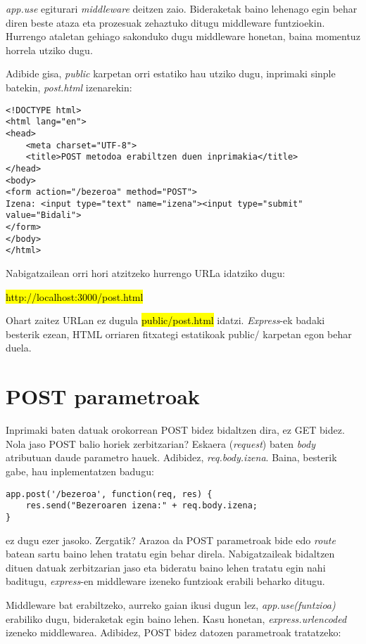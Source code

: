 \textit{app.use} egiturari \textit{middleware} deitzen zaio. Bideraketak baino lehenago egin behar diren beste ataza eta prozesuak zehaztuko ditugu middleware funtzioekin. Hurrengo ataletan gehiago sakonduko dugu middleware honetan, baina momentuz horrela utziko dugu.

Adibide gisa, \textit{public} karpetan orri estatiko hau utziko dugu, inprimaki sinple batekin, \textit{post.html} izenarekin:

\begin{lstlisting}
<!DOCTYPE html>
<html lang="en">
<head>
	<meta charset="UTF-8">
	<title>POST metodoa erabiltzen duen inprimakia</title>
</head>
<body>
<form action="/bezeroa" method="POST">
Izena: <input type="text" name="izena"><input type="submit" value="Bidali">
</form>
</body>
</html>
\end{lstlisting}

Nabigatzailean orri hori atzitzeko hurrengo URLa idatziko dugu:

\hl{http://localhost:3000/post.html}

Ohart zaitez URLan ez dugula \hl{public/post.html} idatzi. \textit{Express}-ek badaki besterik ezean, HTML orriaren fitxategi estatikoak public/ karpetan egon behar duela.


\section{POST parametroak}

Inprimaki baten datuak orokorrean POST bidez bidaltzen dira, ez GET bidez. Nola jaso POST balio horiek zerbitzarian? Eskaera (\textit{request}) baten \textit{body} atributuan daude parametro hauek. Adibidez, \textit{req.body.izena}. Baina, besterik gabe, hau inplementatzen badugu:

\begin{lstlisting}
app.post('/bezeroa', function(req, res) {
    res.send("Bezeroaren izena:" + req.body.izena;
}
\end{lstlisting}

ez dugu ezer jasoko. Zergatik? Arazoa da POST parametroak bide edo \textit{route} batean sartu baino lehen tratatu egin behar direla. Nabigatzaileak bidaltzen dituen datuak zerbitzarian jaso eta bideratu baino lehen tratatu egin nahi baditugu, \textit{express}-en middleware izeneko funtzioak erabili beharko ditugu.

Middleware bat erabiltzeko, aurreko gaian ikusi dugun lez, \textit{app.use(funtzioa)} erabiliko dugu, bideraketak egin baino lehen. Kasu honetan, \textit{express.urlencoded} izeneko middlewarea. Adibidez, POST bidez datozen parametroak tratatzeko:

